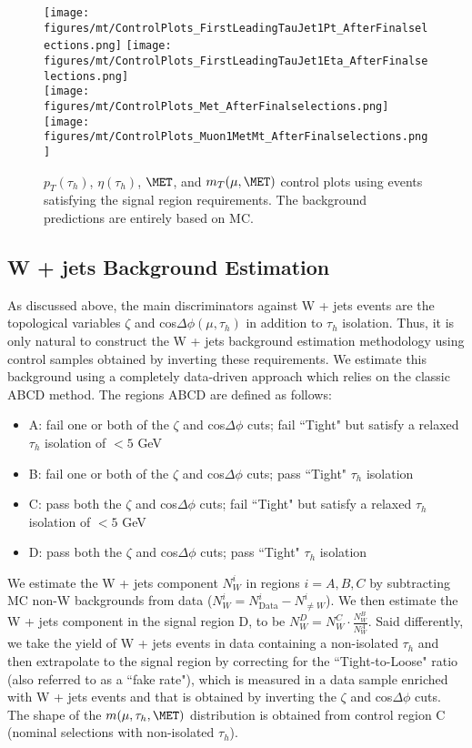 \begin{figure}\centering
  \texttt{[image: figures/mt/ControlPlots\_FirstLeadingTauJet1Pt\_AfterFinalselections.png]}
  \texttt{[image: figures/mt/ControlPlots\_FirstLeadingTauJet1Eta\_AfterFinalselections.png]} \\
  \texttt{[image: figures/mt/ControlPlots\_Met\_AfterFinalselections.png]}
  \texttt{[image: figures/mt/ControlPlots\_Muon1MetMt\_AfterFinalselections.png]}
  \caption{\label{fig:muTauFinalselectionControlPlots} $p_{T}(\tau_{h})$, $\eta(\tau_{h})$, $\MET$, and $m_{T}(\mu,\MET)$ control plots using events satisfying 
the signal region requirements. The background predictions are entirely based on MC.}
\end{figure}

\subsection{W + jets Background Estimation}

As discussed above, the main discriminators against W + jets events are the topological variables $\zeta$ and cos$\Delta\phi(\mu,\tau_{h})$ in addition to 
$\tau_{h}$ isolation. Thus, it is only natural to construct the W + jets background estimation methodology using control samples obtained by inverting these 
requirements. We estimate this background using a completely data-driven approach which relies on the classic ABCD method. The regions ABCD are defined as 
follows:

\begin{itemize}
  \item A: fail one or both of the $\zeta$ and cos$\Delta\phi$ cuts; fail ``Tight" but satisfy a relaxed $\tau_{h}$ isolation of $< 5$ GeV
  \item B: fail one or both of the $\zeta$ and cos$\Delta\phi$ cuts; pass ``Tight" $\tau_{h}$ isolation
  \item C: pass both the $\zeta$ and cos$\Delta\phi$ cuts; fail ``Tight" but satisfy a relaxed $\tau_{h}$ isolation of $< 5$ GeV
  \item D: pass both the $\zeta$ and cos$\Delta\phi$ cuts; pass ``Tight" $\tau_{h}$ isolation
\end{itemize}

We estimate the W + jets component $N_{W}^{i}$ in regions $i=A,B,C$ by subtracting MC non-W backgrounds
from data ($N_{W}^{i}=N_{\textrm{Data}}^{i}-N_{\neq W}^{i}$). We then estimate the W + jets component in the signal region D, to
be $N_{W}^{D} = N_{W}^{C} \cdot \frac{N_{W}^{B}}{N_{W}^{A}}$. Said differently, we take the yield of W + jets events in data containing a non-isolated $\tau_{h}$ 
and then extrapolate to the signal region by correcting for the ``Tight-to-Loose" ratio (also referred to as a ``fake rate"), which is measured in a data sample 
enriched with W + jets events and that is obtained by inverting the $\zeta$ and cos$\Delta\phi$ cuts. The shape of the $m(\mu,\tau_{h},\MET)$ distribution is 
obtained from control region C (nominal selections with non-isolated $\tau_{h}$).

